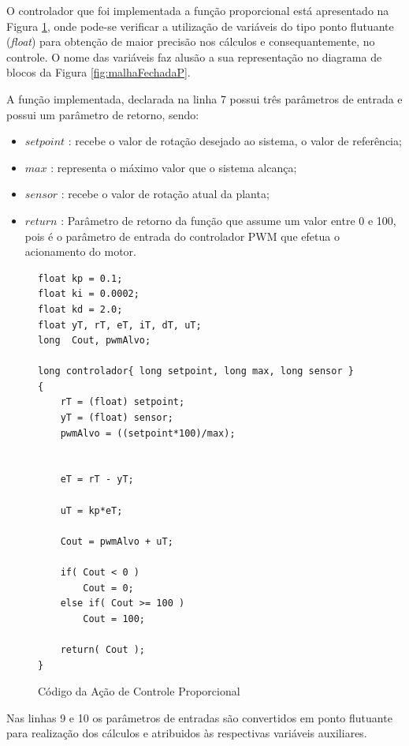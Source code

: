O controlador que foi implementada a função proporcional está apresentado na Figura \ref{fig:codigoControladorP}, onde pode-se verificar a utilização de variáveis do tipo ponto flutuante (\emph{float}) para obtenção de maior precisão nos cálculos e consequantemente, no controle. O nome das variáveis faz alusão a sua representação no diagrama de blocos da Figura \ref{fig:malhaFechadaP}.

A função implementada, declarada na linha 7 possui três parâmetros de entrada e possui um parâmetro de retorno, sendo:
\begin{itemize}
  \item $setpoint$ : recebe o valor de rotação desejado ao sistema, o valor de referência;
  \item $max$ : representa o máximo valor que o sistema alcança;
  \item $sensor$ : recebe o valor de rotação atual da planta;
  \item $return $ : Parâmetro de retorno da função que assume um valor entre 0 e 100, pois é o parâmetro de entrada do controlador PWM que efetua o acionamento do motor.

\end{itemize}



\begin{figure}[!htb]
\centering
\begin{minipage}{0.8\linewidth}
\lstset{firstnumber=1}
\begin{lstlisting}
float kp = 0.1;
float ki = 0.0002;
float kd = 2.0;
float yT, rT, eT, iT, dT, uT;
long  Cout, pwmAlvo;

long controlador{ long setpoint, long max, long sensor }
{
    rT = (float) setpoint;
    yT = (float) sensor;
    pwmAlvo = ((setpoint*100)/max);

    
    eT = rT - yT;
    
    uT = kp*eT;

    Cout = pwmAlvo + uT;

    if( Cout < 0 )
        Cout = 0;
    else if( Cout >= 100 )
        Cout = 100;

    return( Cout );
}
\end{lstlisting}
\end{minipage}
\caption{Código da Ação de Controle Proporcional}
\label{fig:codigoControladorP}
\end{figure}


Nas linhas 9 e 10 os parâmetros de entradas são convertidos em ponto flutuante para realização dos cálculos e atribuidos às respectivas variáveis auxiliares.

